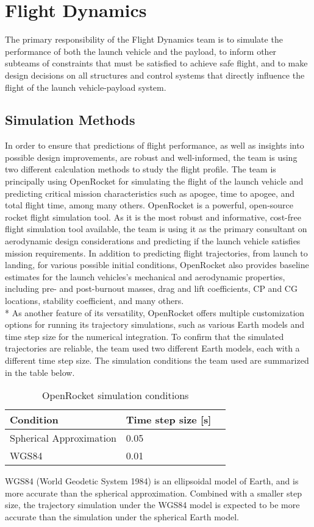 \chapter{Flight Dynamics}
The primary responsibility of the Flight Dynamics team is to simulate the performance of both the launch vehicle and the payload, to inform other subteams of constraints that must be satisfied to achieve safe flight, and to make design decisions on all structures and control systems that directly influence the flight of the launch vehicle-payload system.

\section{Simulation Methods}
In order to ensure that predictions of flight performance, as well as insights into possible design improvements, are robust and well-informed, the team is using two different calculation methods to study the flight profile. The team is principally using OpenRocket for simulating the flight of the launch vehicle and predicting critical mission characteristics such as apogee, time to apogee, and total flight time, among many others. OpenRocket is a powerful, open-source rocket flight simulation tool. As it is the most robust and informative, cost-free flight simulation tool available, the team is using it as the primary consultant on aerodynamic design considerations and predicting if the launch vehicle satisfies mission requirements. In addition to predicting flight trajectories, from launch to landing, for various possible initial conditions, OpenRocket also provides baseline estimates for the launch vehicles's mechanical and aerodynamic properties, including pre- and post-burnout masses, drag and lift coefficients, CP and CG locations, stability coefficient, and many others. 
\\*
\newline
As another feature of its versatility, OpenRocket offers multiple customization options for running its trajectory simulations, such as various Earth models and time step size for the numerical integration. To confirm that the simulated trajectories are reliable, the team used two different Earth models, each with a different time step size. The simulation conditions the team used are summarized in the table below.
\begin{table}[H]
\centering
 \caption{OpenRocket simulation conditions}
 \label{tab:FlightDynamics:SimulationConditions}
\begin{tabularx}{.5\linewidth}{llX}
\toprule
 \textbf{Condition} &  \textbf{Time step size [s]} \\
\midrule
   Spherical Approximation &    0.05 \\
    WGS84 &     0.01 \\
\bottomrule
\end{tabularx}
\end{table}
WGS84 (World Geodetic System 1984) is an ellipsoidal model of Earth, and is more accurate than the spherical approximation. Combined with a smaller step size, the trajectory simulation under the WGS84 model is expected to be more accurate than the simulation under the spherical Earth model.

